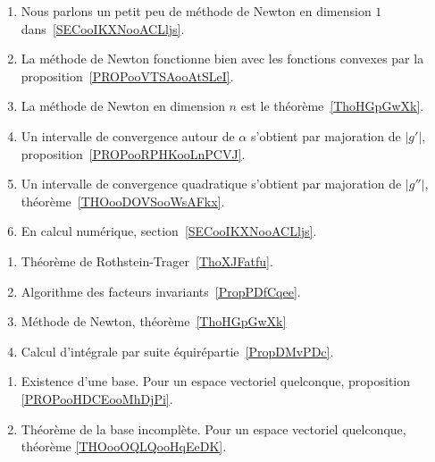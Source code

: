     \begin{enumerate}
        \item
            Nous parlons un petit peu de méthode de Newton en dimension \( 1\) dans~\ref{SECooIKXNooACLljs}.
        \item
            La méthode de Newton fonctionne bien avec les fonctions convexes par la proposition~\ref{PROPooVTSAooAtSLeI}.
        \item
            La méthode de Newton en dimension $n$ est le théorème~\ref{ThoHGpGwXk}.
       \item
            Un intervalle de convergence autour de \( \alpha\) s'obtient par majoration de \( | g' |\), proposition~\ref{PROPooRPHKooLnPCVJ}.
       \item
           Un intervalle de convergence quadratique s'obtient par majoration de \( | g'' |\), théorème~\ref{THOooDOVSooWsAFkx}.
       \item
           En calcul numérique, section~\ref{SECooIKXNooACLljs}.
       \end{enumerate}


\begin{enumerate}
    \item
        Théorème de Rothstein-Trager~\ref{ThoXJFatfu}.
    \item
        Algorithme des facteurs invariants~\ref{PropPDfCqee}.
    \item
        Méthode de Newton, théorème~\ref{ThoHGpGwXk}
    \item
        Calcul d'intégrale par suite équirépartie~\ref{PropDMvPDc}.
\end{enumerate}


\begin{enumerate}
    \item
        Existence d'une base. Pour un espace vectoriel quelconque, proposition \ref{PROPooHDCEooMhDjPi}.
    \item
        Théorème de la base incomplète. Pour un espace vectoriel quelconque, théorème \ref{THOooOQLQooHqEeDK}.
\end{enumerate}

